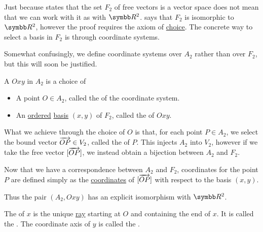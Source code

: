 \begin{Definition}\label{def:euclidean_plane_coordinate_system}
  Just because  states that the set \( F_2 \) of free vectors is a vector space does not mean that we can work with it as with \( \BR^2 \).  says that \( F_2 \) is isomorphic to \( \BR^2 \), however the proof requires the axiom of \hyperref[def:set_zfc/A9]{choice}. The concrete way to select a basis in \( F_2 \) is through coordinate systems.

  Somewhat confusingly, we define coordinate systems over \( A_2 \) rather than over \( F_2 \), but this will soon be justified.

  A  \( Oxy \) in \( A_2 \) is a choice of
  \begin{itemize}
    \item A point \( O \in A_2 \), called the  of the coordinate system.
    \item An \hyperref[def:poset]{ordered} \hyperref[def:left_module_hamel_basis]{basis} \( (x, y) \) of \( F_2 \), called the  of \( Oxy \).
  \end{itemize}

  What we achieve through the choice of \( O \) is that, for each point \( P \in A_2 \), we select the bound vector \( \overrightarrow{OP} \in V_2 \), called the  of \( P \). This injects \( A_2 \) into \( V_2 \), however if we take the free vector \( [\overrightarrow{OP}] \), we instead obtain a bijection between \( A_2 \) and \( F_2 \).

  Now that we have a correspondence between \( A_2 \) and \( F_2 \), coordinates for the point \( P \) are defined simply as the \hyperref[def:left_module_basis_projection]{coordinates} of \( [\overrightarrow{OP}] \) with respect to the basis \( (x, y) \).

  Thus the pair \( (A_2, Oxy) \) has an explicit isomorphism with \( \BR^2 \).

  The  of \( x \) is the unique \hyperref[def:affine_plane/ray]{ray} starting at \( O \) and containing the end of \( x \). It is called the . The coordinate axis of \( y \) is called the .
\end{Definition}

